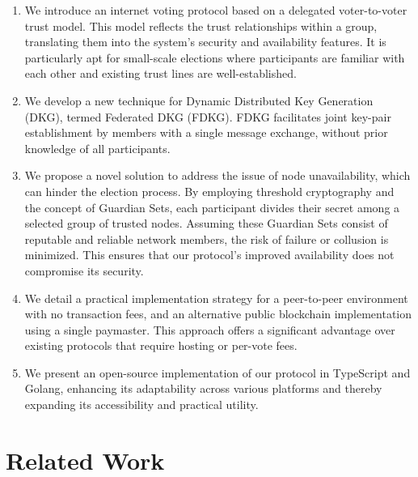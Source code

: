 \documentclass[runningheads]{llncs}
\begin{document}
\begin{enumerate}
    \item We introduce an internet voting protocol based on a delegated voter-to-voter trust model. This model reflects the trust relationships within a group, translating them into the system’s security and availability features. It is particularly apt for small-scale elections where participants are familiar with each other and existing trust lines are well-established.
    
    \item We develop a new technique for Dynamic Distributed Key Generation (DKG), termed Federated DKG (FDKG). FDKG facilitates joint key-pair establishment by members with a single message exchange, without prior knowledge of all participants.

    \item We propose a novel solution to address the issue of node unavailability, which can hinder the election process. By employing threshold cryptography and the concept of Guardian Sets, each participant divides their secret among a selected group of trusted nodes. Assuming these Guardian Sets consist of reputable and reliable network members, the risk of failure or collusion is minimized. This ensures that our protocol’s improved availability does not compromise its security.
    
    \item We detail a practical implementation strategy for a peer-to-peer environment with no transaction fees, and an alternative public blockchain implementation using a single paymaster. This approach offers a significant advantage over existing protocols that require hosting or per-vote fees.

    \item We present an open-source implementation of our protocol in TypeScript and Golang, enhancing its adaptability across various platforms and thereby expanding its accessibility and practical utility.
\end{enumerate}


\section{Related Work}
\end{document}
